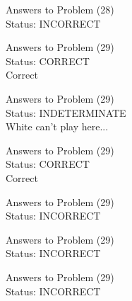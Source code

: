 \documentclass[11pt]{article}
\begin{document}
\begin{minipage}[t]{0.5\textwidth}
  {\centering
  
  Answers to Problem (28)\\
  Status: INCORRECT\\
  
  }
\end{minipage}
\begin{minipage}[t]{0.5\textwidth}
  {\centering
  
  Answers to Problem (29)\\
  Status: CORRECT\\
  Correct\\
  }
\end{minipage}
\begin{minipage}[t]{0.5\textwidth}
  {\centering
  
  Answers to Problem (29)\\
  Status: INDETERMINATE\\
  White can't play here...\\
  }
\end{minipage}
\begin{minipage}[t]{0.5\textwidth}
  {\centering
  
  Answers to Problem (29)\\
  Status: CORRECT\\
  Correct\\
  }
\end{minipage}
\begin{minipage}[t]{0.5\textwidth}
  {\centering
  
  Answers to Problem (29)\\
  Status: INCORRECT\\
  
  }
\end{minipage}
\begin{minipage}[t]{0.5\textwidth}
  {\centering
  
  Answers to Problem (29)\\
  Status: INCORRECT\\
  
  }
\end{minipage}
\begin{minipage}[t]{0.5\textwidth}
  {\centering
  
  Answers to Problem (29)\\
  Status: INCORRECT\\
  
  }
\end{minipage}
\end{document}
